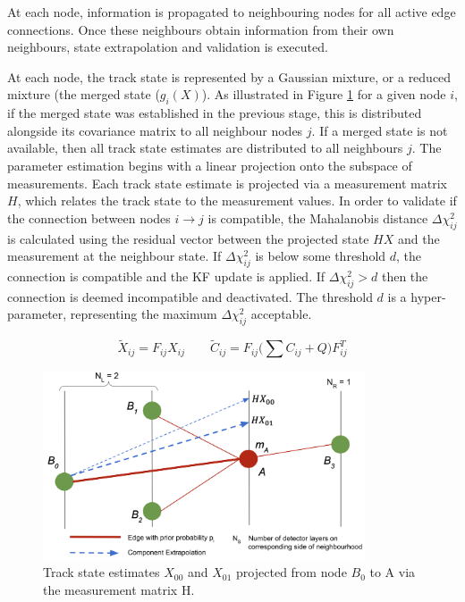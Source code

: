 

At each node, information is propagated to neighbouring nodes for all active edge connections. Once these neighbours obtain information from their own neighbours, state extrapolation and validation is executed. 

At each node, the track state is represented by a Gaussian mixture, or a reduced mixture (the merged state ($g_i(X)$). As illustrated in Figure \ref{fig:extrapolation} for a given node $i$, if the merged state was established in the previous stage, this is distributed alongside its covariance matrix to all neighbour nodes $j$. If a merged state is not available, then all track state estimates are distributed to all neighbours $j$. The parameter estimation begins with a linear projection onto the subspace of measurements. Each track state estimate is projected via a measurement matrix $H$, which relates the track state to the measurement values. In order to validate if the connection between nodes $i \rightarrow j$ is compatible, the Mahalanobis distance $\Delta \chi^{2}_{ij}$ is calculated using the residual vector between the projected state $HX$ and the measurement at the neighbour state. If $\Delta \chi^{2}_{ij}$ is below some threshold $d$, the connection is compatible and the KF update is applied. If $\Delta \chi^{2}_{ij} > d$ then the connection is deemed incompatible and deactivated. The threshold $d$ is a hyper-parameter, representing the maximum $\Delta \chi^{2}_{ij}$ acceptable.


\begin{equation}
\tilde{X}_{ij} = F_{ij} X_{ij} \qquad \tilde{C}_{ij} = F_{ij} \biggl( \sum C_{ij} + Q \biggl) F^{T}_{ij}
\label{eqn:extrapolation}
\end{equation}

\begin{figure}[htbp]
        \centering
        \includegraphics[width=0.85\textwidth]{images/5-gnn-algorithm/gnn-extrapolation.png}
        \caption{Track state estimates $X_{00}$ and $X_{01}$ projected from node $B_0$ to A via the measurement matrix H.}
        \label{fig:extrapolation}%
\end{figure}


